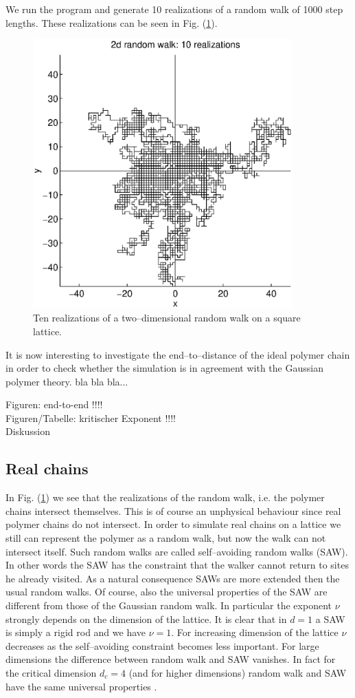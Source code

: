 We run the program and generate 10 realizations of a random walk
of 1000 step lengths. These realizations can be seen in Fig. 
(\ref{F_RW_2D}).
\begin{figure}
\label{F_RW_2D}
\includegraphics[width=10cm]{./Figures/f_rw_2d.eps}
\caption{Ten realizations of a two--dimensional random walk on a square
lattice.}
\end{figure}
It is now interesting to investigate the end--to--distance of the
ideal polymer chain in order to check whether the simulation is in 
agreement with the Gaussian polymer theory. bla bla bla...

Figuren: end-to-end !!!!\\

Figuren/Tabelle: kritischer Exponent !!!! \\

Diskussion \\

\subsection{Real chains}
In Fig. (\ref{F_RW_2D}) we see that the realizations of the random walk, i.e. 
the polymer chains intersect themselves. This is of course an 
unphysical behaviour since real polymer chains do not intersect.
In order to simulate real chains on a lattice we still can 
represent  the polymer as a random walk, but now the walk can not 
intersect itself. Such random walks are called self--avoiding 
random walks (SAW). In other words the SAW has the constraint that 
the walker cannot return to sites he already visited. As a natural 
consequence SAWs are more extended then the usual random walks. Of 
course, also the universal properties of the SAW are different 
from those of the Gaussian random walk. In particular the exponent
$\nu$ strongly depends on the dimension of the lattice. It is 
clear that in $d=1$ a SAW is simply a rigid rod and we have 
$\nu=1$. For increasing dimension of the lattice $\nu$ 
decreases as the self--avoiding constraint becomes less important. 
For large dimensions the difference between random walk and SAW 
vanishes. In fact for the critical dimension $d_c =4$ (and for higher
dimensions) random walk 
and SAW have the same universal properties \cite{DE_GENNES,RAPOSO}. 

